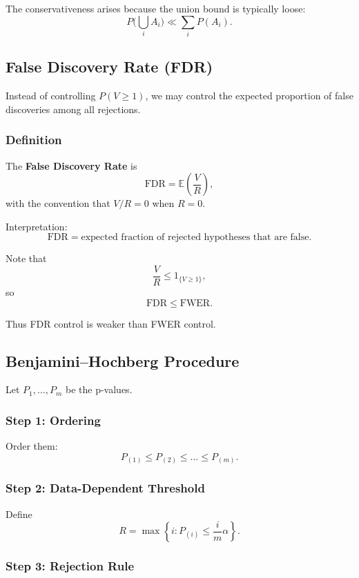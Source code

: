 The conservativeness arises because the union bound is typically loose:
\[
P\Big( \bigcup_i A_i \Big) \ll \sum_i P(A_i).
\]

\subsection{False Discovery Rate (FDR)}

Instead of controlling $P(V \ge 1)$, we may control the expected proportion of false discoveries among all rejections.

\subsubsection*{Definition}

The \textbf{False Discovery Rate} is
\[
\text{FDR} = \mathbb{E}\!\left( \frac{V}{R} \right),
\]
with the convention that $V/R = 0$ when $R=0$.

Interpretation:
\[
\text{FDR} = \text{expected fraction of rejected hypotheses that are false}.
\]

Note that
\[
\frac{V}{R} \le 1_{\{V \ge 1\}},
\]
so
\[
\text{FDR} \le \text{FWER}.
\]

Thus FDR control is weaker than FWER control.

\subsection{Benjamini–Hochberg Procedure}

Let $P_1, \dots, P_m$ be the p-values.

\subsubsection*{Step 1: Ordering}

Order them:
\[
P_{(1)} \le P_{(2)} \le \dots \le P_{(m)}.
\]

\subsubsection*{Step 2: Data-Dependent Threshold}

Define
\[
R = \max \left\{ i : P_{(i)} \le \frac{i}{m}\alpha \right\}.
\]

\subsubsection*{Step 3: Rejection Rule}

